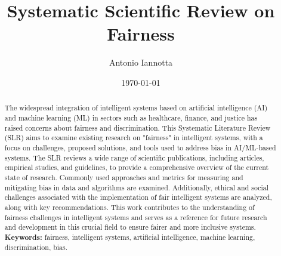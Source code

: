 \documentclass{article}
\title{Systematic Scientific Review on Fairness}
\author{Antonio Iannotta}
\date{\today}
\begin{document}
\maketitle

\begin{abstract}
    The widespread integration of intelligent systems based on artificial intelligence (AI) and machine learning (ML) in sectors such as healthcare, finance, and justice has raised concerns about fairness and discrimination. This Systematic Literature Review (SLR) aims to examine existing research on "fairness" in intelligent systems, with a focus on challenges, proposed solutions, and tools used to address bias in AI/ML-based systems.
    The SLR reviews a wide range of scientific publications, including articles, empirical studies, and guidelines, to provide a comprehensive overview of the current state of research. Commonly used approaches and metrics for measuring and mitigating bias in data and algorithms are examined. Additionally, ethical and social challenges associated with the implementation of fair intelligent systems are analyzed, along with key recommendations.
    This work contributes to the understanding of fairness challenges in intelligent systems and serves as a reference for future research and development in this crucial field to ensure fairer and more inclusive systems. \\
    \textbf{Keywords:} fairness, intelligent systems, artificial intelligence, machine learning, discrimination, bias.
\end{abstract}
\newpage
\end{document}
